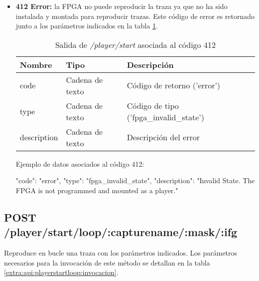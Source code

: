 \begin{itemize}
{\begin{minipage}{\textwidth}
Ejemplo de datos asociados al código 400:

\begin{code}[language=json]
{
  "code": "error",
  "type": "notification",
  "description": "Invalid parameters. The FPGA could not start playing a capture."
}
\end{code}
\end{minipage}
}

\item{\textbf{412 Error:} la \gls{FPGA} no puede reproducir la \gls{traza} ya que no ha sido instalada y montada para reproducir \glspl{traza}. Este código de error es retornado junto a los parámetros indicados en la tabla \ref{extra:api:playerstart:error412}.
\begin{table}[H]
\centering
\begin{tabular}{|l|l|l|}
\hline
\rowcolor[HTML]{F5F5F5}
\textbf{Nombre}  & \textbf{Tipo}   & \textbf{Descripción}                    \\ \hline
code             & Cadena de texto & Código de retorno ('error')             \\ \hline
type             & Cadena de texto & Código de tipo ('fpga\_invalid\_state') \\ \hline
description      & Cadena de texto & Descripción del error                   \\ \hline
\end{tabular}
\caption{Salida de \textit{/player/start} asociada al código 412}
\label{extra:api:playerstart:error412}
\end{table}

\begin{minipage}{\textwidth}
Ejemplo de datos asociados al código 412:

\begin{code}[language=json]
{
  "code": "error",
  "type": "fpga_invalid_state",
  "description": "Invalid State. The FPGA is not programmed and mounted as a player."
}
\end{code}
\end{minipage}
}

\end{itemize}

%
%
\subsection{POST /player/start/loop/:capturename/:mask/:ifg}
Reproduce en bucle una \gls{traza} con los parámetros indicados. Los parámetros necesarios para la invocación de este método se detallan en la tabla \ref{extra:api:playerstartloop:invocacion}.

